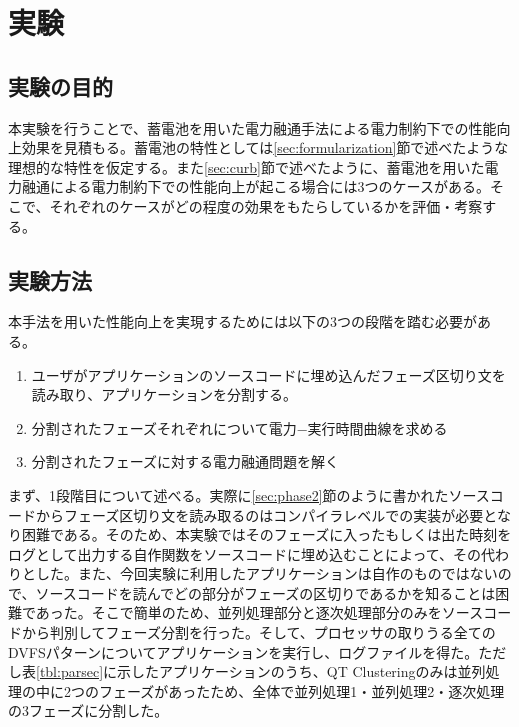 \chapter{実験}
\label{chap:experiment}


\section{実験の目的}
\label{sec:purpose}

本実験を行うことで、蓄電池を用いた電力融通手法による電力制約下での性能向上効果を見積もる。蓄電池の特性としては\ref{sec:formularization}節で述べたような理想的な特性を仮定する。また\ref{sec:curb}節で述べたように、蓄電池を用いた電力融通による電力制約下での性能向上が起こる場合には3つのケースがある。そこで、それぞれのケースがどの程度の効果をもたらしているかを評価・考察する。



\section{実験方法}
\label{sec:method}

本手法を用いた性能向上を実現するためには以下の3つの段階を踏む必要がある。

\begin{enumerate}
\item ユーザがアプリケーションのソースコードに埋め込んだフェーズ区切り文を読み取り、アプリケーションを分割する。
\item 分割されたフェーズそれぞれについて電力−実行時間曲線を求める
\item 分割されたフェーズに対する電力融通問題を解く
\end{enumerate}

まず、1段階目について述べる。実際に\ref{sec:phase2}節のように書かれたソースコードからフェーズ区切り文を読み取るのはコンパイラレベルでの実装が必要となり困難である。そのため、本実験ではそのフェーズに入ったもしくは出た時刻をログとして出力する自作関数をソースコードに埋め込むことによって、その代わりとした。また、今回実験に利用したアプリケーションは自作のものではないので、ソースコードを読んでどの部分がフェーズの区切りであるかを知ることは困難であった。そこで簡単のため、並列処理部分と逐次処理部分のみをソースコードから判別してフェーズ分割を行った。そして、プロセッサの取りうる全てのDVFSパターンについてアプリケーションを実行し、ログファイルを得た。ただし表\ref{tbl:parsec}に示したアプリケーションのうち、QT Clusteringのみは並列処理の中に2つのフェーズがあったため、全体で並列処理1・並列処理2・逐次処理の3フェーズに分割した。

